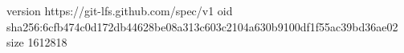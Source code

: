 version https://git-lfs.github.com/spec/v1
oid sha256:6cfb474c0d172db44628be08a313c603c2104a630b9100df1f55ac39bd36ae02
size 1612818
